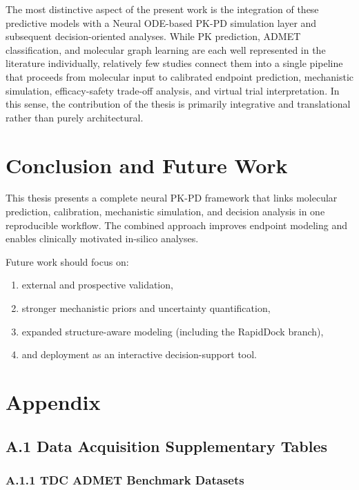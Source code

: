 \documentclass[a4paper,11pt,twoside]{report}
\begin{document}
The most distinctive aspect of the present work is the integration of these predictive models with a Neural ODE-based PK-PD simulation layer and subsequent decision-oriented analyses. While PK prediction, ADMET classification, and molecular graph learning are each well represented in the literature individually, relatively few studies connect them into a single pipeline that proceeds from molecular input to calibrated endpoint prediction, mechanistic simulation, efficacy-safety trade-off analysis, and virtual trial interpretation. In this sense, the contribution of the thesis is primarily integrative and translational rather than purely architectural.

\chapter{Conclusion and Future Work}

This thesis presents a complete neural PK-PD framework that links molecular prediction, calibration, mechanistic simulation, and decision analysis in one reproducible workflow. The combined approach improves endpoint modeling and enables clinically motivated in-silico analyses.

Future work should focus on:
\begin{enumerate}
\item external and prospective validation,
\item stronger mechanistic priors and uncertainty quantification,
\item expanded structure-aware modeling (including the RapidDock branch),
\item and deployment as an interactive decision-support tool.
\end{enumerate}

\chapter*{Appendix}
\label{app:supplementary}

\section*{A.1 Data Acquisition Supplementary Tables}

\subsection*{A.1.1 TDC ADMET Benchmark Datasets}
\end{document}
